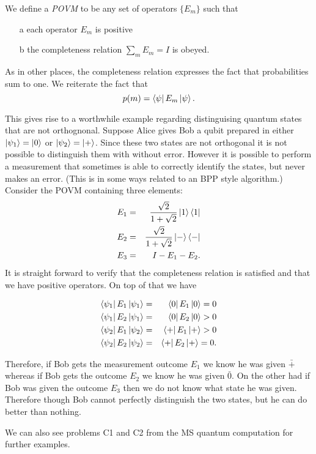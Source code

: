 \documentclass{article}
\begin{document}
\begin{definition}[POVM]
  We define a \textit{POVM} to be any set of operators $\{E_m\}$ such that
  \begin{itemize}
    \item[a] each operator $E_m$ is positive
    \item[b] the completeness relation $\sum_m E_m=I$ is obeyed.
  \end{itemize}
  As in other places, the completeness relation expresses the fact that probabilities sum to one. We reiterate the fact that
  \[p(m)=\bra\psi E_m\ket\psi.\]
\end{definition}

This gives rise to a worthwhile example regarding distinguising quantum states that are not orthognonal. Suppose Alice gives Bob a qubit prepared in either $\ket{\psi_1}=\ket0$ or $\ket{\psi_2}=\ket+$. Since these two states are not orthogonal it is not possible to distinguish them with without error. However it is possible to perform a measurement that sometimes is able to correctly identify the states, but never makes an error. (This is in some ways related to an BPP style algorithm.) Consider the POVM containing three elements:
\begin{eqnarray*}
  E_1&=&\frac{\sqrt2}{1+\sqrt2}\ket1\bra1 \\
  E_2&=&\frac{\sqrt2}{1+\sqrt2}\ket{-}\bra{-} \\
  E_3&=&I-E_1-E_2.
\end{eqnarray*}
It is straight forward to verify that the completeness relation is satisfied and that we have positive operators. On top of that we have

\begin{eqnarray*}
  \bra{\psi_1}E_1\ket{\psi_1}&=&\bra0E_1\ket0=0\\
  \bra{\psi_1}E_2\ket{\psi_1}&=&\bra0E_2\ket0>0\\
  \bra{\psi_2}E_1\ket{\psi_2}&=&\bra+E_1\ket+>0\\
  \bra{\psi_2}E_2\ket{\psi_2}&=&\bra+E_2\ket+=0.
\end{eqnarray*}

Therefore, if Bob gets the measurement outcome $E_1$ we know he was given $\bar+$ whereas if Bob gets the outcome $E_2$ we know he was given $\bar0$. On the other had if Bob was given the outcome $E_3$ then we do not know what state he was given. Therefore though Bob cannot perfectly distinguish the two states, but he can do better than nothing.

We can also see problems C1 and C2 from the MS quantum computation for further examples.
\end{document}
